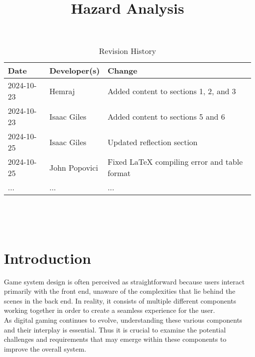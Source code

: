\documentclass{article}
\title{Hazard Analysis\\\progname}
\author{\authname}
\date{}
\begin{document}
\maketitle
\thispagestyle{empty}



\begin{table}[hp]
\caption{Revision History} \label{TblRevisionHistory}
\begin{tabularx}{\textwidth}{llX}
\toprule
\textbf{Date} & \textbf{Developer(s)} & \textbf{Change}\\
\midrule
2024-10-23 & Hemraj & Added content to sections 1, 2, and 3\\
2024-10-23 & Isaac Giles & Added content to sections 5 and 6 \\
2024-10-25 & Isaac Giles & Updated reflection section \\
2024-10-25 & John Popovici & Fixed LaTeX compiling error and table format \\
... & ... & ...\\
\bottomrule
\end{tabularx}
\end{table}

~\newpage

\tableofcontents

~\newpage



\section{Introduction}

Game system design is often perceived as straightforward because users interact primarily with the front end, unaware of the complexities that lie behind the scenes in the back end. In reality, it consists of multiple different components working together in order to create a seamless experience for the user.\\

As digital gaming continues to evolve, understanding these various components and their interplay is essential. Thus it is crucial to examine the potential challenges and requirements that may emerge within these components to improve the overall system.

\end{document}
